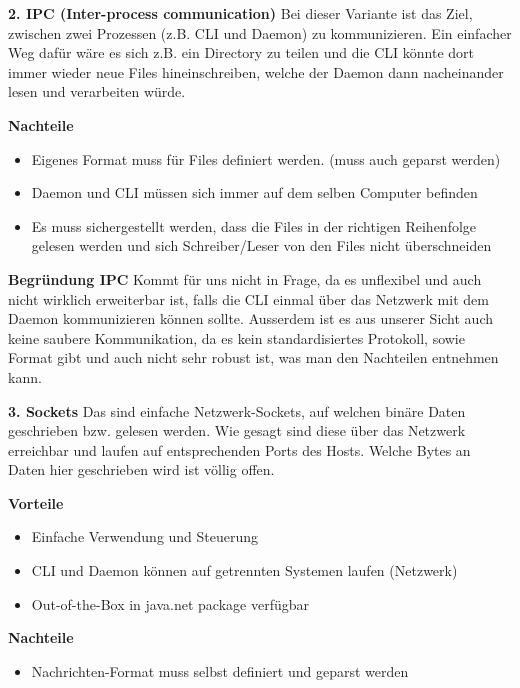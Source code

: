 \documentclass[a4paper,12pt]{report}
\begin{document}
    \textbf{2. IPC (Inter-process communication)}
    Bei dieser Variante ist das Ziel, zwischen zwei Prozessen (z.B. CLI und Daemon) zu kommunizieren.
    Ein einfacher Weg dafür wäre es sich z.B. ein Directory zu teilen und die CLI könnte dort immer wieder neue Files hineinschreiben,
    welche der Daemon dann nacheinander lesen und verarbeiten würde.

    \textbf{Nachteile}
    \begin{itemize}
        \item Eigenes Format muss für Files definiert werden.
        (muss auch geparst werden)
        \item Daemon und CLI müssen sich immer auf dem selben Computer befinden
        \item Es muss sichergestellt werden, dass die Files in der richtigen Reihenfolge gelesen werden und sich
        Schreiber/Leser von den Files nicht überschneiden
    \end{itemize}

    \textbf{Begründung IPC} Kommt für uns nicht in Frage, da es unflexibel und auch nicht wirklich erweiterbar ist,
    falls die CLI einmal über das Netzwerk mit dem Daemon kommunizieren können sollte.
    Ausserdem ist es aus unserer Sicht auch keine saubere Kommunikation, da es kein standardisiertes Protokoll,
    sowie Format gibt und auch nicht sehr robust ist, was man den Nachteilen entnehmen kann.

    \textbf{3. Sockets}
    Das sind einfache Netzwerk-Sockets, auf welchen binäre Daten geschrieben bzw. gelesen werden.
    Wie gesagt sind diese über das Netzwerk erreichbar und laufen auf entsprechenden Ports des Hosts.
    Welche Bytes an Daten hier geschrieben wird ist völlig offen.

    \textbf{Vorteile}
    \begin{itemize}
        \item Einfache Verwendung und Steuerung
        \item CLI und Daemon können auf getrennten Systemen laufen (Netzwerk)
        \item Out-of-the-Box in java.net package verfügbar
    \end{itemize}

    \textbf{Nachteile}
    \begin{itemize}
        \item Nachrichten-Format muss selbst definiert und geparst werden
    \end{itemize}
\end{document}
